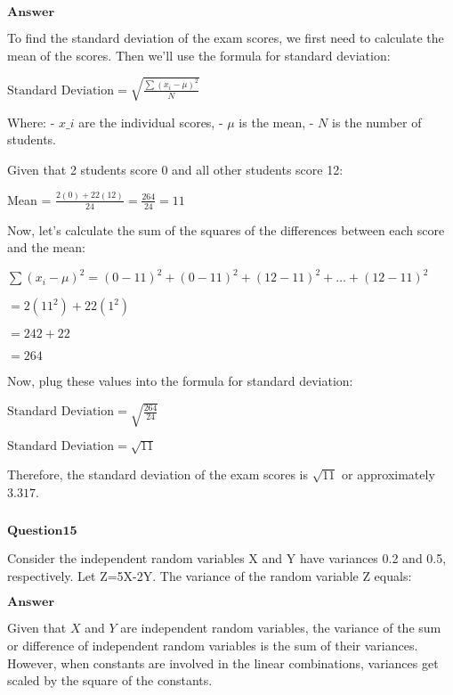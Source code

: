 \documentclass[11pt]{article}
\makeatletter
\newcommand{\boxspacing}{\kern\kvtcb@left@rule\kern\kvtcb@boxsep}
\newcommand{\prompt}[4]{
        {\ttfamily\llap{{\color{#2}[#3]:\hspace{3pt}#4}}\vspace{-\baselineskip}}
    }
\makeatother
\begin{document}
$\textbf{Answer}$

    To find the standard deviation of the exam scores, we first need to
calculate the mean of the scores. Then we'll use the formula for
standard deviation:

$ \text{Standard Deviation} = \sqrt{\frac{\sum{(x_i - \mu)^2}}{N}} $

Where: - $ x\_i $ are the individual scores, - $ \mu $ is the mean,
- $ N $ is the number of students.

Given that 2 students score 0 and all other students score 12:

Mean = $ \frac{2(0) + 22(12)}{24} = \frac{264}{24} = 11 $

Now, let's calculate the sum of the squares of the differences between
each score and the mean:

$ \sum{(x_i - \mu)^2} = (0 - 11)^2 + (0 - 11)^2 + (12 - 11)^2
+ \dots + (12 - 11)^2 $

$ = 2(11^2) + 22(1^2) $

$ = 242 + 22 $

$ = 264 $

Now, plug these values into the formula for standard deviation:

$ \text{Standard Deviation} = \sqrt{\frac{264}{24}} $

$ \text{Standard Deviation} = \sqrt{11} $

Therefore, the standard deviation of the exam scores is $ \sqrt{11} $
or approximately $ 3.317 $.

    \begin{tcolorbox}[breakable, size=fbox, boxrule=1pt, pad at break*=1mm,colback=cellbackground, colframe=cellborder]
\prompt{In}{incolor}{ }{\boxspacing}
\begin{Verbatim}[commandchars=\\\{\}]

\end{Verbatim}
\end{tcolorbox}

    $\textbf{Question15}$

Consider the independent random variables X and Y have variances 0.2 and
0.5, respectively. Let Z=5X-2Y. The variance of the random variable Z
equals:

$\textbf{Answer}$

    Given that $ X $ and $ Y $ are independent random variables, the
variance of the sum or difference of independent random variables is the
sum of their variances. However, when constants are involved in the
linear combinations, variances get scaled by the square of the
constants.
\end{document}
